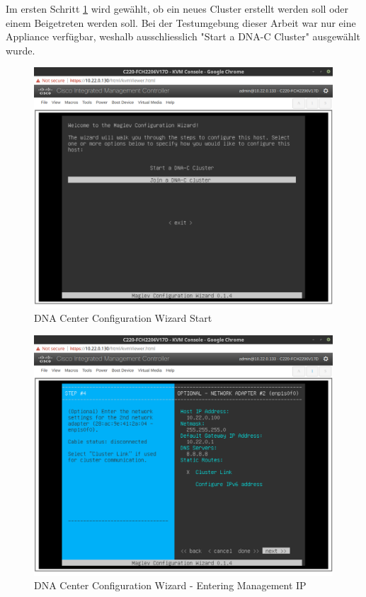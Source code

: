 Im ersten Schritt \ref{fig:dna-center-install-step-1} wird gewählt, ob ein neues Cluster erstellt werden soll oder einem Beigetreten werden soll. Bei der Testumgebung dieser Arbeit war nur eine Appliance verfügbar, weshalb ausschliesslich "Start a DNA-C Cluster" ausgewählt wurde. 

\begin{figure}[H]
	\centering
	\includegraphics[height=9cm]{img/sc_001.png}
	\caption{DNA Center Configuration Wizard Start}
	\label{fig:dna-center-install-step-1}
\end{figure} 

\begin{figure}[H]
	\centering
	\includegraphics[height=9cm]{img/sc_002.png}
	\caption{DNA Center Configuration Wizard - Entering Management IP}
	\label{fig:dna-center-install-step-4}
\end{figure} 

